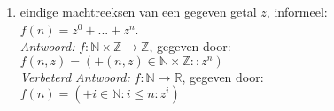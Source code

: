 \begin{enumerate}
\begin{enumerate}
    \item eindige machtreeksen van een gegeven getal $z$, informeel: $f(n)= z^{0} + ... +  z^{n}$. \\
        \emph{Antwoord:} $f: \mathbb{N} \times \mathbb{Z} \rightarrow \mathbb{Z}$, gegeven door:\\
            $f(n, z) = ( + (n, z) \in \mathbb{N} \times \mathbb{Z} : : z^{n} )$ \\
        \emph{Verbeterd Antwoord:} $f: \mathbb{N} \rightarrow \mathbb{R}$, gegeven door:\\
            $f(n) = (+ i \in \mathbb{N} : i \leq n : z^i )$ \\


\end{enumerate}
\end{enumerate}
